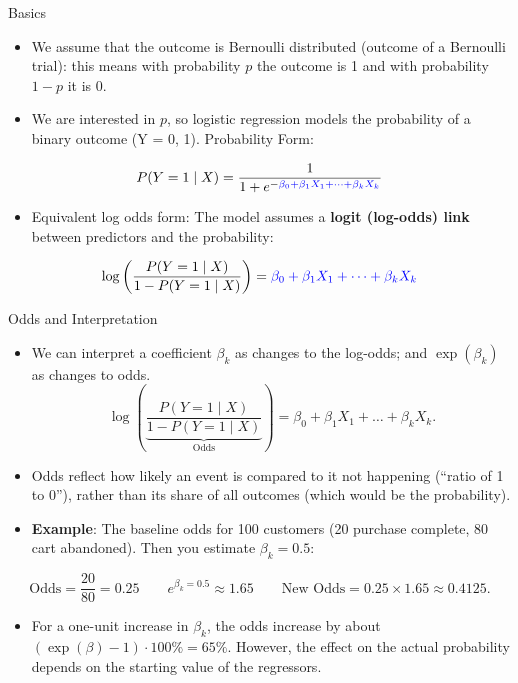 \documentclass[
  10pt,
  ignorenonframetext,
]{beamer}
\providecommand{\tightlist}{%
  \setlength{\itemsep}{0pt}\setlength{\parskip}{0pt}}\usepackage{longtable,booktabs,array}
\begin{document}
\begin{frame}{Basics}
\label{basics}
\begin{itemize}
\item
  We assume that the outcome is Bernoulli distributed (outcome of a
  Bernoulli trial): this means with probability \(p\) the outcome is 1
  and with probability \(1-p\) it is 0.
\item
  We are interested in \(p\), so logistic regression models the
  probability of a binary outcome (Y = 0, 1). Probability Form:
\end{itemize}

\[
  P(Y = 1 \mid X) = \frac{1}{1 + e^{-\textcolor{blue}{\beta_0 + \beta_1 X_1 + \dots + \beta_k X_k}}}
\]

\begin{itemize}
\tightlist
\item
  Equivalent log odds form: The model assumes a \textbf{logit (log-odds)
  link} between predictors and the probability:
\end{itemize}

\[
\log\left(\frac{P(Y = 1 \mid X)}{1 - P(Y = 1 \mid X)}\right) = \textcolor{blue}{\beta_0 + \beta_1 X_1 + \dots + \beta_k X_k}
\]
\end{frame}

\begin{frame}{Odds and Interpretation}
\label{odds-and-interpretation}
\small

\begin{itemize}
\item
  We can interpret a coefficient \(\beta_k\) as changes to the log-odds;
  and \(\exp(\beta_k)\) as changes to odds. \[
  \log\left(\underbrace{\frac{P(Y = 1 \mid X)}{1 - P(Y = 1 \mid X)}}_{\text{Odds}}\right) = \beta_0 + \beta_1 X_1 + \dots + \beta_k X_k.
  \]
\item
  Odds reflect how likely an event is compared to it not happening
  (``ratio of 1 to 0''), rather than its share of all outcomes (which
  would be the probability).
\item
  \textbf{Example}: The baseline odds for 100 customers (20 purchase
  complete, 80 cart abandoned). Then you estimate \(\beta_k = 0.5\):
\end{itemize}

\[
  \text{Odds} = \frac{20}{80} = 0.25 \quad\quad e^{\beta_k = 0.5} \approx 1.65 \quad\quad \text{New Odds} = 0.25 \times 1.65 \approx 0.4125.
\]

\begin{itemize}
\tightlist
\item
  For a one-unit increase in \(\beta_k\), the odds increase by about
  \((\exp(\beta) - 1) \cdot 100 \% = 65\%\). However, the effect on the
  actual probability depends on the starting value of the regressors.
\end{itemize}
\end{frame}
\end{document}
